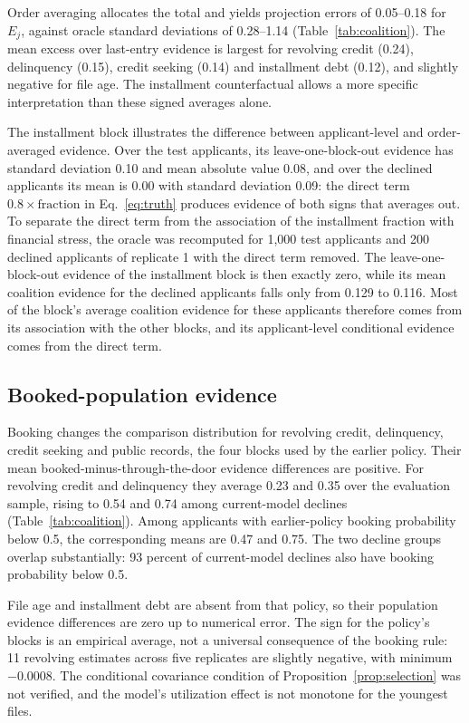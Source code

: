 Order averaging allocates the total and yields projection errors of 0.05--0.18 for $E_j$, against oracle standard deviations of 0.28--1.14 (Table~\ref{tab:coalition}). The mean excess over last-entry evidence is largest for revolving credit (0.24), delinquency (0.15), credit seeking (0.14) and installment debt (0.12), and slightly negative for file age. The installment counterfactual allows a more specific interpretation than these signed averages alone.

The installment block illustrates the difference between applicant-level and order-averaged evidence. Over the test applicants, its leave-one-block-out evidence has standard deviation 0.10 and mean absolute value 0.08, and over the declined applicants its mean is 0.00 with standard deviation 0.09: the direct term $0.8\times\text{fraction}$ in Eq.~\eqref{eq:truth} produces evidence of both signs that averages out. To separate the direct term from the association of the installment fraction with financial stress, the oracle was recomputed for 1{,}000 test applicants and 200 declined applicants of replicate 1 with the direct term removed. The leave-one-block-out evidence of the installment block is then exactly zero, while its mean coalition evidence for the declined applicants falls only from 0.129 to 0.116. Most of the block's average coalition evidence for these applicants therefore comes from its association with the other blocks, and its applicant-level conditional evidence comes from the direct term.




\subsection{Booked-population evidence}

Booking changes the comparison distribution for revolving credit, delinquency, credit seeking and public records, the four blocks used by the earlier policy. Their mean booked-minus-through-the-door evidence differences are positive. For revolving credit and delinquency they average 0.23 and 0.35 over the evaluation sample, rising to 0.54 and 0.74 among current-model declines (Table~\ref{tab:coalition}). Among applicants with earlier-policy booking probability below 0.5, the corresponding means are 0.47 and 0.75. The two decline groups overlap substantially: 93 percent of current-model declines also have booking probability below 0.5.

File age and installment debt are absent from that policy, so their population evidence differences are zero up to numerical error. The sign for the policy's blocks is an empirical average, not a universal consequence of the booking rule: 11 revolving estimates across five replicates are slightly negative, with minimum $-0.0008$. The conditional covariance condition of Proposition~\ref{prop:selection} was not verified, and the model's utilization effect is not monotone for the youngest files.

